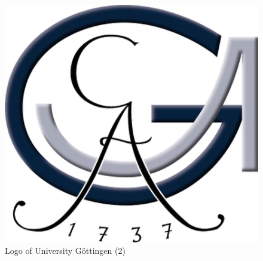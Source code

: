 \begin{figure}[!ht]
  \centering
  \includegraphics[width=\textwidth]{figures/UniLogo1.png}
  \caption{Logo of University Göttingen (2)}
  \label{fig:logo-2}
\end{figure}

